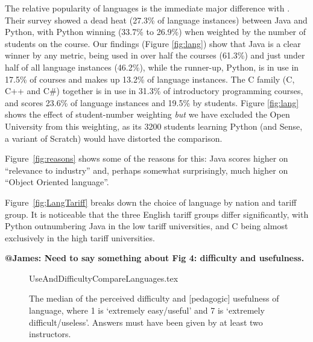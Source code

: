 \documentclass{sig-alternate}
\begin{document}
The relative popularity of languages is the immediate major difference with
\cite{mason+cooper:2014}. Their survey showed a dead heat (27.3\% of
language instances) between Java and Python, with Python winning (33.7\% to
26.9\%) when weighted by the number of students on the course.  Our
findings (Figure \ref{fig:lang}) show that Java is a clear winner by
any metric, being used in over half the courses (61.3\%) and just under half of all language instances (46.2\%), while the
runner-up, Python, is in use in 17.5\% of courses and makes up 13.2\% of language instances. The C family (C, C++ and C\#) together
is in use in 31.3\% of introductory programming courses, and scores 23.6\% of language instances and 19.5\% by students. Figure
\ref{fig:lang} shows the effect of student-number weighting \emph{but}
we have excluded the Open University from this weighting, as its 3200
students learning Python (and Sense, a variant of Scratch) would have
distorted the comparison.



Figure~\ref{fig:reasons} shows some of the reasons for this: Java
scores higher on ``relevance to industry'' and, perhaps somewhat
surprisingly, much higher on ``Object Oriented language''.

Figure~\ref{fig;LangTariff} breaks down the choice of language by
nation and tariff group.  It is noticeable that the three English
tariff groups differ significantly, with Python outnumbering Java in
the low tariff universities, and C being almost exclusively in the
high tariff universities.

\bf{@James: Need to say something about Fig 4: difficulty and usefulness.}

\begin{figure}
\begin{center}
{UseAndDifficultyCompareLanguages.tex}
\end{center}\vskip-18pt
\caption{The median of the perceived difficulty and [pedagogic] usefulness of language, where 1 is `extremely easy/useful' and 7 is `extremely difficult/useless'.  Answers must have been given by at least two instructors.\label{fig:utility}}
\end{figure}
\end{document}
